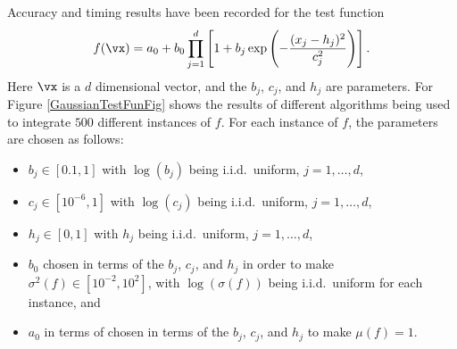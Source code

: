 \documentclass[graybox]{svmult}
\begin{document}
Accuracy and timing results have been recorded for the test function
\begin{equation} \label{GaussianTestFun}
f(\vx)=a_0 + b_0\prod_{j=1}^d\left[ 1 +b_j \exp \left(-\frac{(x_j-h_j)^2}{c_j^2}\right) \right].
\end{equation}
Here $\vx$ is a $d$ dimensional vector, and the $b_j$, $c_j$, and $h_j$ are parameters.  For Figure \ref{GaussianTestFunFig} shows the results of different algorithms being used to integrate $500$ different instances of $f$.  For each instance of $f$, the parameters are chosen as follows:
\begin{itemize} 
\item $b_j \in [0.1,1]$ with $\log(b_j)$ being i.i.d.\ uniform, $j=1, \ldots, d$,
\item $c_j \in [10^{-6},1]$ with $\log(c_j)$ being i.i.d.\ uniform, $j=1, \ldots, d$,
\item $h_j \in [0,1]$ with $h_j$ being i.i.d.\ uniform, $j=1, \ldots, d$,
\item $b_0$ chosen in terms of the $b_j$, $c_j$, and $h_j$ in order to make $\sigma^2(f) \in [10^{-2}, 10^2]$, with $\log(\sigma(f))$ being i.i.d.\ uniform for each instance, and
\item $a_0$ in terms of chosen in terms of the $b_j$, $c_j$, and $h_j$ to make $\mu(f)=1$.
\end{itemize}
\end{document}
